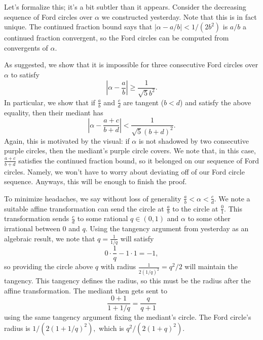 Let's formalize this; it's a bit subtler than it appears. Consider the decreasing sequence of Ford circles over $\alpha$ we constructed yesterday. Note that this is in fact unique. The continued fraction bound says that $|\alpha-a/b|<1/\left(2b^2\right)$ is $a/b$ a continued fraction convergent, so the Ford circles can be computed from convergents of $\alpha.$

As suggested, we show that it is impossible for three consecutive Ford circles over $\alpha$ to satisfy
\[\left|\alpha-\frac ab\right|\ge\frac1{\sqrt 5b^2}.\]
In particular, we show that if $\frac ab$ and $\frac cd$ are tangent ($b<d$) and satisfy the above equality, then their mediant has
\[\left|\alpha-\frac{a+c}{b+d}\right|<\frac1{\sqrt5(b+d)^2}.\]
Again, this is motivated by the visual: if $\alpha$ is not shadowed by two consecutive purple circles, then the mediant's purple circle covers. We note that, in this case, $\frac{a+c}{b+d}$ satisfies the continued fraction bound, so it belonged on our sequence of Ford circles. Namely, we won't have to worry about deviating off of our Ford circle sequence. Anyways, this will be enough to finish the proof.

To minimize headaches, we say without loss of generality $\frac ab<\alpha<\frac cd.$ We note a suitable affine transformation can send the circle at $\frac ab$ to the circle at $\frac01.$ This transformation sends $\frac cd$ to some rational $q\in(0,1)$ and $\alpha$ to some other irrational between $0$ and $q.$ Using the tangency argument from yesterday as an algebraic result, we note that $q=\frac{1}{1/q}$ will satisfy
\[0\cdot\frac1q-1\cdot1=-1,\]
so providing the circle above $q$ with radius $\frac1{2(1/q)^2}=q^2/2$ will maintain the tangency. This tangency defines the radius, so this must be the radius after the affine transformation. The mediant then gets sent to
\[\frac{0+1}{1+1/q}=\frac q{q+1}\]
using the same tangency argument fixing the mediant's circle. The Ford circle's radius is $1/\left(2(1+1/q)^2\right),$ which is $q^2/\left(2(1+q)^2\right).$

